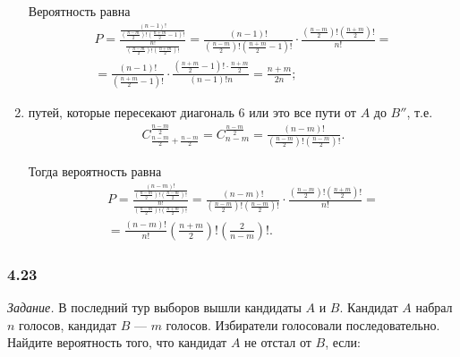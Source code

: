 \documentclass{book}
\begin{document}
\begin{enumerate}[label=(\roman*)]
Вероятность равна
\begin{equation*}
\begin{split}
P =
\frac{\frac{ \left( n-1 \right)!}{ \left( \frac{n-m}{2} \right)! \left( \frac{n+m}{2} - 1 \right)!}}{\frac{n!}{ \left( \frac{n-m}{2} \right)! \left( \frac{n+m}{2} \right)!}} =
\frac{ \left( n-1 \right)!}{ \left( \frac{n-m}{2} \right)! \left( \frac{n+m}{2} - 1 \right)!} \cdot
\frac{ \left( \frac{n-m}{2} \right)! \left( \frac{n+m}{2} \right)!}{n!} = \\
= \frac{ \left( n-1 \right)!}{ \left( \frac{n+m}{2} - 1 \right)! } \cdot
\frac{ \left( \frac{n+m}{2} - 1 \right)! \cdot \frac{n+m}{2} }{ \left( n-1 \right)! n} =
\frac{n+m}{2n};
\end{split}
\end{equation*}

\item путей, которые пересекают диагональ 6 или это все пути от $A$ до $B''$, т.е.
\begin{equation*}
\begin{split}
C_{ \frac{n-m}{2} + \frac{n-m}{2} }^{ \frac{n-m}{2} } =
C_{n-m}^{ \frac{n-m}{2} } =
\frac{ \left( n-m \right)!}{ \left( \frac{n-m}{2} \right)! \left( \frac{n-m}{2} \right)! }.
\end{split}
\end{equation*}

Тогда вероятность равна
\begin{equation*}
\begin{split}
P =
\frac{\frac{ \left( n-m \right)!}{ \left( \frac{n-m}{2} \right)! \left( \frac{n-m}{2} \right)! }}{\frac{n!}{ \left( \frac{n-m}{2} \right)! \left( \frac{n+m}{2} \right)!}} =
\frac{ \left( n-m \right)!}{ \left( \frac{n-m}{2} \right)! \left( \frac{n-m}{2} \right)! } \cdot
\frac{ \left( \frac{n-m}{2} \right)! \left( \frac{n+m}{2} \right)!}{n!} = \\
= \frac{ \left( n-m \right)!}{n!} \left( \frac{n+m}{2} \right)! \left( \frac{2}{n-m} \right)!.
\end{split}
\end{equation*}
\end{enumerate}

\subsubsection*{4.23}

\textit{Задание.} В последний тур выборов вышли кандидаты $A$ и $B$.
Кандидат $A$ набрал $n$ голосов, кандидат $B$ --- $m$ голосов.
Избиратели голосовали последовательно.
Найдите вероятность того, что кандидат $A$ не отстал от $B$, если:
\end{document}
